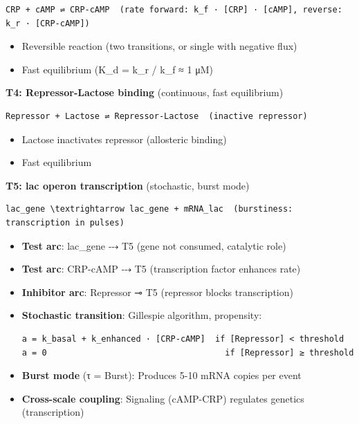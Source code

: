 \begin{lstlisting}
CRP + cAMP ⇌ CRP-cAMP  (rate forward: k_f · [CRP] · [cAMP], reverse: k_r · [CRP-cAMP])
\end{lstlisting}

\begin{itemize}
\tightlist
\item
  Reversible reaction (two transitions, or single with negative flux)
\item
  Fast equilibrium (K\_d = k\_r / k\_f ≈ 1 μM)
\end{itemize}

\textbf{T4: Repressor-Lactose binding} (continuous, fast equilibrium)

\begin{lstlisting}
Repressor + Lactose ⇌ Repressor-Lactose  (inactive repressor)
\end{lstlisting}

\begin{itemize}
\tightlist
\item
  Lactose inactivates repressor (allosteric binding)
\item
  Fast equilibrium
\end{itemize}

\textbf{T5: lac operon transcription} (stochastic, burst mode)

\begin{lstlisting}
lac_gene \textrightarrow lac_gene + mRNA_lac  (burstiness: transcription in pulses)
\end{lstlisting}

\begin{itemize}
\item
  \textbf{Test arc}: lac\_gene ⤏ T5 (gene not consumed, catalytic role)
\item
  \textbf{Test arc}: CRP-cAMP ⤏ T5 (transcription factor enhances rate)
\item
  \textbf{Inhibitor arc}: Repressor ⊸ T5 (repressor blocks
  transcription)
\item
  \textbf{Stochastic transition}: Gillespie algorithm, propensity:

\begin{lstlisting}
a = k_basal + k_enhanced · [CRP-cAMP]  if [Repressor] < threshold
a = 0                                    if [Repressor] ≥ threshold
\end{lstlisting}
\item
  \textbf{Burst mode} (τ = Burst): Produces 5-10 mRNA copies per event
\item
  \textbf{Cross-scale coupling}: Signaling (cAMP-CRP) regulates genetics
  (transcription)
\end{itemize}

